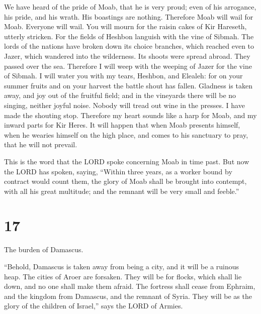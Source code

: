  We have heard of the pride of Moab, that he is very
proud; even of his arrogance, his pride, and his wrath. His boastings
are nothing.  Therefore Moab will wail for Moab. Everyone
will wail. You will mourn for the raisin cakes of Kir Hareseth, utterly
stricken.  For the fields of Heshbon languish with the
vine of Sibmah. The lords of the nations have broken down its choice
branches, which reached even to Jazer, which wandered into the
wilderness. Its shoots were spread abroad. They passed over the sea.
 Therefore I will weep with the weeping of Jazer for the
vine of Sibmah. I will water you with my tears, Heshbon, and Elealeh:
for on your summer fruits and on your harvest the battle shout has
fallen.  Gladness is taken away, and joy out of the
fruitful field; and in the vineyards there will be no singing, neither
joyful noise. Nobody will tread out wine in the presses. I have made the
shouting stop.  Therefore my heart sounds like a harp for
Moab, and my inward parts for Kir Heres.  It will happen
that when Moab presents himself, when he wearies himself on the high
place, and comes to his sanctuary to pray, that he will not prevail.

 This is the word that the LORD spoke concerning Moab in
time past.  But now the LORD has spoken, saying, ``Within
three years, as a worker bound by contract would count them, the glory
of Moab shall be brought into contempt, with all his great multitude;
and the remnant will be very small and feeble.''

\hypertarget{section-16}{%
\section{17}\label{section-16}}

 The burden of Damascus.

``Behold, Damascus is taken away from being a city, and it will be a
ruinous heap.  The cities of Aroer are forsaken. They will
be for flocks, which shall lie down, and no one shall make them afraid.
 The fortress shall cease from Ephraim, and the kingdom
from Damascus, and the remnant of Syria. They will be as the glory of
the children of Israel,'' says the LORD of Armies.

